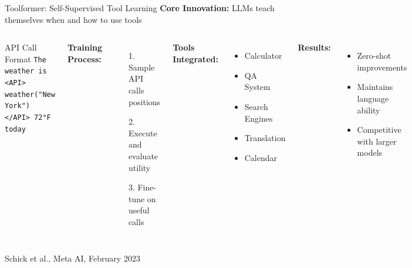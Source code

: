 \documentclass[aspectratio=169]{beamer}
\begin{document}
\begin{frame}{Toolformer: Self-Supervised Tool Learning}
	\textbf{Core Innovation:} LLMs teach themselves when and how to use tools
	
	\begin{columns}
		\begin{block}{API Call Format}
			\footnotesize
			\texttt{The weather is <API>}\\
			\texttt{weather("New York")}\\
			\texttt{</API> 72°F today}
		\end{block}
		
		\textbf{Training Process:}
		\begin{itemize}
			\item[1.] Sample API calls positions
			\item[2.] Execute and evaluate utility
			\item[3.] Fine-tune on useful calls
		\end{itemize}
		
		\textbf{Tools Integrated:}
		\begin{itemize}
			\item Calculator
			\item QA System
			\item Search Engines
			\item Translation
			\item Calendar
		\end{itemize}
		
		\textbf{Results:}
		\begin{itemize}
			\item {\color{highlight}Zero-shot} improvements
			\item Maintains language ability
			\item Competitive with larger models
		\end{itemize}
	\end{columns}
	
	\vspace{0.3cm}
	\small
	Schick et al., Meta AI, February 2023
\end{frame}
\end{document}
